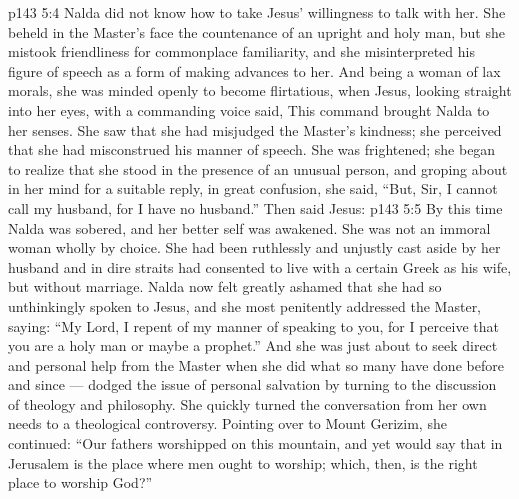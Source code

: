 \vs p143 5:4 Nalda did not know how to take Jesus’ willingness to talk with her. She beheld in the Master’s face the countenance of an upright and holy man, but she mistook friendliness for commonplace familiarity, and she misinterpreted his figure of speech as a form of making advances to her. And being a woman of lax morals, she was minded openly to become flirtatious, when Jesus, looking straight into her eyes, with a commanding voice said,  This command brought Nalda to her senses. She saw that she had misjudged the Master’s kindness; she perceived that she had misconstrued his manner of speech. She was frightened; she began to realize that she stood in the presence of an unusual person, and groping about in her mind for a suitable reply, in great confusion, she said, “But, Sir, I cannot call my husband, for I have no husband.” Then said Jesus: 
\vs p143 5:5 By this time Nalda was sobered, and her better self was awakened. She was not an immoral woman wholly by choice. She had been ruthlessly and unjustly cast aside by her husband and in dire straits had consented to live with a certain Greek as his wife, but without marriage. Nalda now felt greatly ashamed that she had so unthinkingly spoken to Jesus, and she most penitently addressed the Master, saying: “My Lord, I repent of my manner of speaking to you, for I perceive that you are a holy man or maybe a prophet.” And she was just about to seek direct and personal help from the Master when she did what so many have done before and since --- dodged the issue of personal salvation by turning to the discussion of theology and philosophy. She quickly turned the conversation from her own needs to a theological controversy. Pointing over to Mount Gerizim, she continued: “Our fathers worshipped on this mountain, and yet  would say that in Jerusalem is the place where men ought to worship; which, then, is the right place to worship God?”
